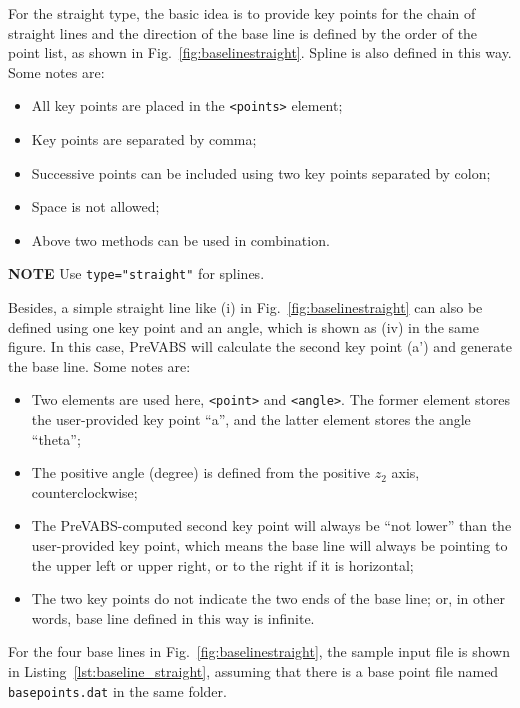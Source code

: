 \documentclass{book}
\begin{document}
For the straight type, the basic idea is to provide key points for the 
chain of straight lines and the direction of the base line is defined 
by the order of the point list, as shown in Fig.~\ref{fig:baselinestraight}. 
Spline is also defined in this way. Some notes are:

\begin{itemize}
  \item All key points are placed in the \lstinline{<points>} element;
  \item Key points are separated by comma;
  \item Successive points can be included using two key points separated by colon;
  \item Space is not allowed;
  \item Above two methods can be used in combination.
\end{itemize}

\textbf{NOTE} Use \lstinline{type="straight"} for splines.

Besides, a simple straight line like (i) in Fig.~\ref{fig:baselinestraight} 
can also be defined using one key point and an angle, which is shown as 
(iv) in the same figure. In this case, PreVABS will calculate the second 
key point (a') and generate the base line. Some notes are:

\begin{itemize}
  \item Two elements are used here, \lstinline{<point>} and \lstinline{<angle>}. 
    The former element stores the user-provided key point ``a'', and the 
    latter element stores the angle ``theta'';
  \item The positive angle (degree) is defined from the positive $z_2$ 
    axis, counterclockwise;
  \item The PreVABS-computed second key point will always be ``not lower'' 
    than the user-provided key point, which means the base line will 
    always be pointing to the upper left or upper right, or to the right 
    if it is horizontal;
  \item The two key points do not indicate the two ends of the base line; 
    or, in other words, base line defined in this way is infinite.
\end{itemize}

For the four base lines in Fig.~\ref{fig:baselinestraight}, the sample 
input file is shown in Listing~\ref{lst:baseline_straight}, assuming 
that there is a base point file named \lstinline{basepoints.dat} in the 
same folder.
\end{document}
